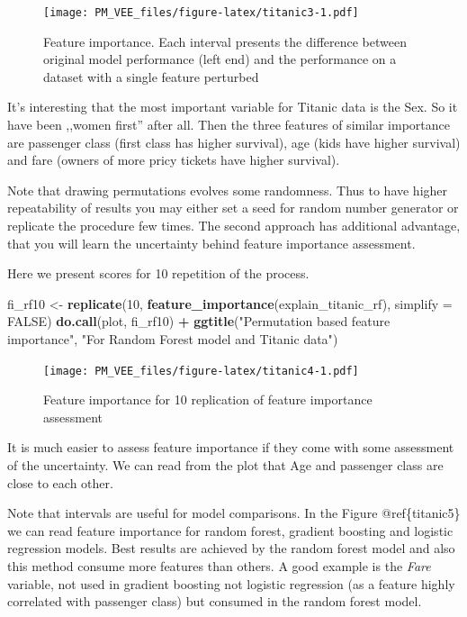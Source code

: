 \documentclass[12pt,]{krantz}
\newenvironment{Shaded}{\begin{snugshade}}{\end{snugshade}}
\newcommand{\DataTypeTok}[1]{\textcolor[rgb]{0.13,0.29,0.53}{#1}}
\newcommand{\DecValTok}[1]{\textcolor[rgb]{0.00,0.00,0.81}{#1}}
\newcommand{\KeywordTok}[1]{\textcolor[rgb]{0.13,0.29,0.53}{\textbf{#1}}}
\newcommand{\NormalTok}[1]{#1}
\newcommand{\OperatorTok}[1]{\textcolor[rgb]{0.81,0.36,0.00}{\textbf{#1}}}
\newcommand{\OtherTok}[1]{\textcolor[rgb]{0.56,0.35,0.01}{#1}}
\newcommand{\StringTok}[1]{\textcolor[rgb]{0.31,0.60,0.02}{#1}}
\theoremstyle{definition}
\theoremstyle{definition}
\theoremstyle{definition}
\theoremstyle{remark}
\begin{document}
\begin{figure}
\centering
\texttt{[image: PM\_VEE\_files/figure-latex/titanic3-1.pdf]}
\caption{\label{fig:titanic3}Feature importance. Each interval presents the
difference between original model performance (left end) and the
performance on a dataset with a single feature perturbed}
\end{figure}

It's interesting that the most important variable for Titanic data is
the Sex. So it have been ,,women first'' after all. Then the three
features of similar importance are passenger class (first class has
higher survival), age (kids have higher survival) and fare (owners of
more pricy tickets have higher survival).

Note that drawing permutations evolves some randomness. Thus to have
higher repeatability of results you may either set a seed for random
number generator or replicate the procedure few times. The second
approach has additional advantage, that you will learn the uncertainty
behind feature importance assessment.

Here we present scores for 10 repetition of the process.

\begin{Shaded}
\begin{Highlighting}[]
\NormalTok{fi_rf10 <-}\StringTok{ }\KeywordTok{replicate}\NormalTok{(}\DecValTok{10}\NormalTok{, }\KeywordTok{feature_importance}\NormalTok{(explain_titanic_rf), }\DataTypeTok{simplify =} \OtherTok{FALSE}\NormalTok{)}
\KeywordTok{do.call}\NormalTok{(plot, fi_rf10) }\OperatorTok{+}\StringTok{ }\KeywordTok{ggtitle}\NormalTok{(}\StringTok{"Permutation based feature importance"}\NormalTok{, }\StringTok{"For Random Forest model and Titanic data"}\NormalTok{)}
\end{Highlighting}
\end{Shaded}

\begin{figure}
\centering
\texttt{[image: PM\_VEE\_files/figure-latex/titanic4-1.pdf]}
\caption{\label{fig:titanic4}Feature importance for 10 replication of
feature importance assessment}
\end{figure}

It is much easier to assess feature importance if they come with some
assessment of the uncertainty. We can read from the plot that Age and
passenger class are close to each other.

Note that intervals are useful for model comparisons. In the Figure
@ref\{titanic5\} we can read feature importance for random forest,
gradient boosting and logistic regression models. Best results are
achieved by the random forest model and also this method consume more
features than others. A good example is the \emph{Fare} variable, not
used in gradient boosting not logistic regression (as a feature highly
correlated with passenger class) but consumed in the random forest
model.
\end{document}
